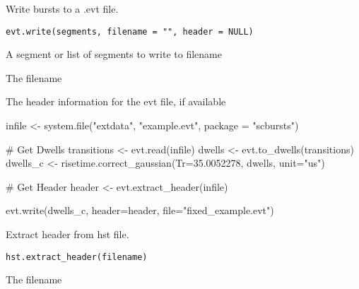 \documentclass[letterpaper]{book}
\begin{document}
%
\begin{Description}\relax
Write bursts to a .evt file.
\end{Description}
%
\begin{Usage}
\begin{verbatim}
evt.write(segments, filename = "", header = NULL)
\end{verbatim}
\end{Usage}
%
\begin{Arguments}
\begin{ldescription}
\item[\code{segments}] A segment or list of segments to write to filename

\item[\code{filename}] The filename

\item[\code{header}] The header information for the evt file, if available
\end{ldescription}
\end{Arguments}
%
\begin{Examples}
\begin{ExampleCode}

infile <- system.file("extdata", "example.evt", package = "scbursts")

# Get Dwells
transitions <- evt.read(infile)
dwells <- evt.to_dwells(transitions)
dwells_c <- risetime.correct_gaussian(Tr=35.0052278, dwells, unit="us")

# Get Header
header <- evt.extract_header(infile)

evt.write(dwells_c, header=header, file="fixed_example.evt")

\end{ExampleCode}
\end{Examples}
%
\begin{Description}\relax
Extract header from hst file.
\end{Description}
%
\begin{Usage}
\begin{verbatim}
hst.extract_header(filename)
\end{verbatim}
\end{Usage}
%
\begin{Arguments}
\begin{ldescription}
\item[\code{filename}] The filename
\end{ldescription}
\end{Arguments}
\end{document}
